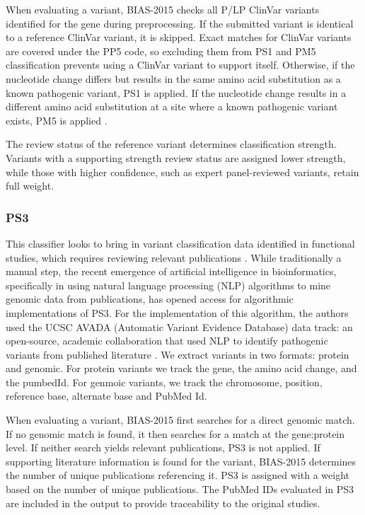 \documentclass[unnumsec,webpdf,contemporary,large]{oup-authoring-template}
\theoremstyle{thmstyleone}
\theoremstyle{thmstyletwo}
\theoremstyle{thmstylethree}
\begin{document}
When evaluating a variant, BIAS-2015 checks all P/LP ClinVar variants identified for the gene during preprocessing. If the submitted variant is identical to a reference ClinVar variant, it is skipped. Exact matches for ClinVar variants are covered under the PP5 code, so excluding them from PS1 and PM5 classification prevents using a ClinVar variant to support itself. Otherwise, if the nucleotide change differs but results in the same amino acid substitution as a known pathogenic variant, PS1 is applied. If the nucleotide change results in a different amino acid substitution at a site where a known pathogenic variant exists, PM5 is applied\cite{bhat2023informing} .

The review status of the reference variant determines classification strength. Variants with a supporting strength review status are assigned lower strength, while those with higher confidence, such as expert panel-reviewed variants, retain full weight.

\subsubsection{PS3}
This classifier looks to bring in variant classification data identified in functional studies, which requires reviewing relevant publications \cite{brnich2019recommendations}. While traditionally a manual step, the recent emergence of artificial intelligence in bioinformatics, specifically in using natural language processing (NLP) algorithms to mine genomic data from publications, has opened access for algorithmic implementations of PS3.   For the implementation of this algorithm, the authors used the UCSC AVADA (Automatic Variant Evidence Database) data track: an open-source, academic collaboration that used NLP to identify pathogenic variants from published literature \cite{birgmeier2020avada}.  We extract variants in two formats: protein and genomic. For protein variants we track the gene, the amino acid change, and the pumbedId.  For genmoic variants, we track the chromosome, position, reference base, alternate base and PubMed Id.  

When evaluating a variant, BIAS-2015 first searches for a direct genomic match. If no genomic match is found, it then searches for a match at the gene:protein level. If neither search yields relevant publications, PS3 is not applied. If supporting literature information is found for the variant, BIAS-2015 determines the number of unique publications referencing it. PS3 is assigned with a weight based on the number of unique publications. The PubMed IDs evaluated in PS3 are included in the output to provide traceability to the original studies.
\end{document}
